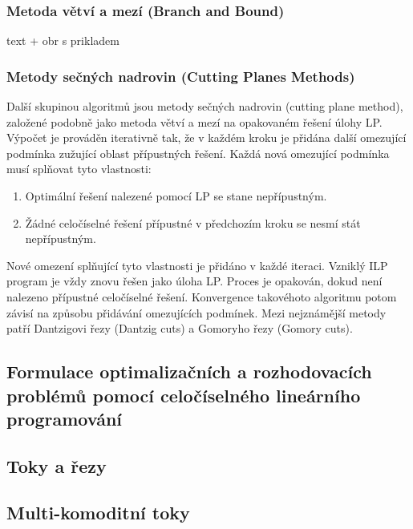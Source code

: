 \subsubsection*{Metoda větví a mezí (Branch and Bound)}
text + obr s prikladem

\subsubsection*{Metody sečných nadrovin (Cutting Planes Methods)}
Další skupinou algoritmů jsou metody sečných nadrovin (cutting plane method), založené podobně jako metoda větví a mezí na opakovaném řešení úlohy LP. Výpočet je prováděn iterativně tak, že v každém kroku je přidána další omezující podmínka zužující oblast přípustných řešení. Každá nová omezující podmínka musí splňovat tyto vlastnosti:

\begin{enumerate}
	\item Optimální řešení nalezené pomocí LP se stane nepřípustným.
	\item Žádné celočíselné řešení přípustné v předchozím kroku se nesmí stát nepřípustným. 
\end{enumerate}

Nové omezení splňující tyto vlastnosti je přidáno v každé iteraci. Vzniklý ILP program je vždy znovu řešen jako úloha LP. Proces je opakován, dokud není nalezeno přípustné celočíselné řešení. Konvergence takovéhoto algoritmu potom závisí na způsobu přidávání omezujících podmínek. Mezi nejznámější metody patří Dantzigovi řezy (Dantzig cuts) a Gomoryho řezy (Gomory cuts). \cite{ko:ilp-sucha}

\subsection*{Formulace optimalizačních a rozhodovacích problémů pomocí celočíselného lineárního programování}

\subsection*{Toky a řezy}

\subsection*{Multi-komoditní toky}